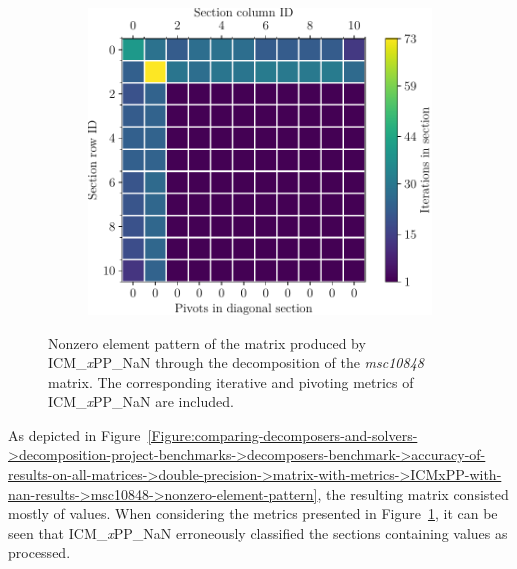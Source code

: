 \begin{figure}[ht!]
\begin{subfigure}[t]{0.51\textwidth}
		\includegraphics[width=\textwidth, keepaspectratio, clip]{images/ch03/input-matrices/decomposition-benchmarks/msc10848_icmxpp_nan_metrics.pdf}
		\label{Figure:comparing-decomposers-and-solvers->decomposition-project-benchmarks->decomposers-benchmark->accuracy-of-results-on-all-matrices->double-precision->matrix-with-metrics->ICMxPP-with-nan-results->msc10848->metrics}
	\end{subfigure}
	\caption{Nonzero element pattern of the  matrix produced by ICM\_\textit{x}PP\_NaN through the decomposition of the \textit{msc10848} matrix.
		The corresponding iterative and pivoting metrics of ICM\_\textit{x}PP\_NaN are included.
	}
	\label{Figure:comparing-decomposers-and-solvers->decomposition-project-benchmarks->decomposers-benchmark->accuracy-of-results-on-all-matrices->double-precision->matrix-with-metrics->ICMxPP-with-nan-results->msc10848}
\end{figure}

As depicted in Figure~\ref{Figure:comparing-decomposers-and-solvers->decomposition-project-benchmarks->decomposers-benchmark->accuracy-of-results-on-all-matrices->double-precision->matrix-with-metrics->ICMxPP-with-nan-results->msc10848->nonzero-element-pattern}, the resulting matrix consisted mostly of  values.
When considering the metrics presented in Figure~\ref{Figure:comparing-decomposers-and-solvers->decomposition-project-benchmarks->decomposers-benchmark->accuracy-of-results-on-all-matrices->double-precision->matrix-with-metrics->ICMxPP-with-nan-results->msc10848->metrics}, it can be seen that ICM\_\textit{x}PP\_NaN erroneously classified the sections containing  values as processed.

